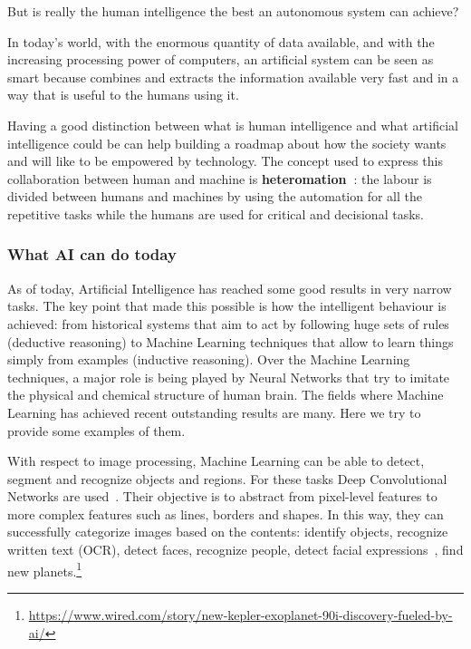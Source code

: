 But is really the human intelligence the best an autonomous system can achieve? 

In today's world, with the enormous quantity of data available, and with the increasing processing power of computers, an artificial system can be seen as smart because combines and extracts the information available very fast and in a way that is useful to the humans using it.

Having a good distinction between what is human intelligence and what artificial intelligence could be can help building a roadmap about how the society wants and will like to be empowered by technology. The concept used to express this collaboration between human and machine is \textbf{heteromation~\cite{ekbia2014heteromation}}: the labour is divided between humans and machines by using the automation for all the repetitive tasks while the humans are used for critical and decisional tasks.

\subsubsection{What AI can do today}
As of today, Artificial Intelligence has reached some good results in very narrow tasks. The key point that made this possible is how the intelligent behaviour is achieved: from historical systems that aim to act by following huge sets of rules (deductive reasoning) to Machine Learning techniques that allow to learn things simply from examples (inductive reasoning). Over the Machine Learning techniques, a major role is being played by Neural Networks that try to imitate the physical and chemical structure of human brain. The fields where Machine Learning has achieved recent outstanding results are many. Here we try to provide some examples of them.

With respect to image processing, Machine Learning can be able to detect, segment and recognize objects and regions. For these tasks Deep Convolutional Networks are used~\cite{lecun2015deep}. Their objective is to abstract from pixel-level features to more complex features such as lines, borders and shapes. In this way, they can successfully categorize images based on the contents: identify objects, recognize written text (OCR), detect faces, recognize people, detect facial expressions~\cite{tian2005facial}, find new planets.\footnote{\url{https://www.wired.com/story/new-kepler-exoplanet-90i-discovery-fueled-by-ai/}}

